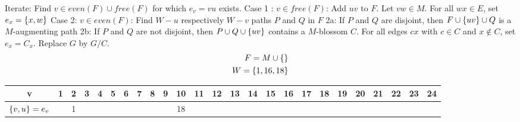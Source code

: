 Iterate: Find $v \in even(F) \cup free(F)$ for which $e_v=vu$ exists. \newline
Case 1 : $v \in free(F)$: Add $uv$ to $F$. Let $vw\in M$. For all $wx \in E$, set $e_x = \left\{x,w\right\}$ \newline
Case 2: $v \in even(F)$: Find $W-u$ respectively $W-v$ paths $P$ and $Q$ in $F$ \newline
2a: If $P$ and $Q$ are disjoint, then $F \cup \left\{uv\right\} \cup Q$ is a $M$-augmenting path \newline
2b: If $P$ and $Q$ are not disjoint, then $P \cup Q \cup \left\{uv\right\}$ contains a $M$-blossom $C$. For all edges $cx$ with $c \in C$ and $x \not \in C$, set $e_x = C_x$. Replace $G$ by $G / C$.
\begin{align*}
	F=M\cup \left\{\right\} \\
	W=\left\{1,16,18\right\}
\end{align*}
{
\tiny
\begin{tabular}{ c | c | c | c | c | c | c | c | c | c |c | c | c | c | c |c | c | c | c | c |c | c | c | c | c}
  v & 1 & 2 & 3 & 4 & 5 & 6 & 7 & 8 & 9 & 10 & 11 & 12 & 13 & 14 & 15 & 16 & 17 & 18 & 19 & 20 & 21 & 22 & 23 & 24 \\
  \hline 
  $\left\{v,u\right\}=e_v$ & & 1 & & & & & & & & 18
\end{tabular}
}
